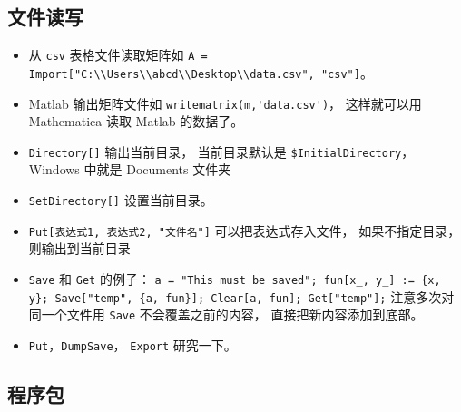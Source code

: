 \subsection{文件读写}
\begin{itemize}
\item 从 \verb|csv| 表格文件读取矩阵如 \verb|A = Import["C:\\Users\\abcd\\Desktop\\data.csv", "csv"]|。
\item Matlab 输出矩阵文件如 \verb|writematrix(m,'data.csv')|， 这样就可以用 Mathematica 读取 Matlab 的数据了。
\item \verb|Directory[]| 输出当前目录， 当前目录默认是 \verb|$InitialDirectory|， Windows 中就是 Documents 文件夹
\item \verb|SetDirectory[]| 设置当前目录。
\item \verb|Put[表达式1, 表达式2, "文件名"]| 可以把表达式存入文件， 如果不指定目录， 则输出到当前目录
\item \verb|Save| 和 \verb|Get| 的例子： \verb|a = "This must be saved"; fun[x_, y_] := {x, y}; Save["temp", {a, fun}]; Clear[a, fun]; Get["temp"];| 注意多次对同一个文件用 \verb|Save| 不会覆盖之前的内容， 直接把新内容添加到底部。
\item \verb|Put|，\verb|DumpSave|， \verb|Export| 研究一下。
\end{itemize}

\subsection{程序包}

